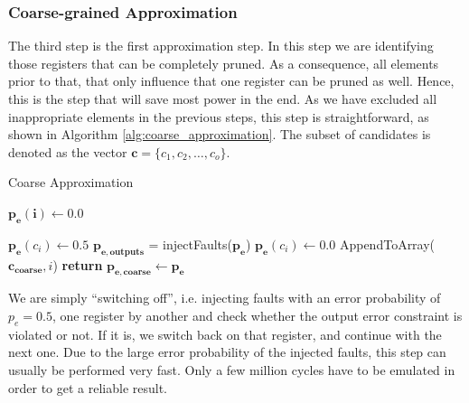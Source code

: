\documentclass[conference]{IEEEtran}
\begin{document}
\subsubsection{Coarse-grained Approximation}
The third step is the first approximation step. In this step we are identifying those registers that can be completely pruned. As a consequence, all elements prior to that, that only influence that one register can be pruned as well. Hence, this is the step that will save most power in the end. As we have excluded all inappropriate elements in the previous steps, this step is straightforward, as shown in Algorithm \ref{alg:coarse_approximation}. The subset of candidates is denoted as the vector $\mathbf{c} = \{c_1,c_2,\ldots,c_{o}\}$.
\begin{algorithm}
  \caption{Coarse Approximation}\label{alg:coarse_approximation}
  \begin{algorithmic}[1]
    \State $\mathbf{p_e(i)} \gets 0.0$
    \EndFor

    \State $\mathbf{p_e}(c_i) \gets 0.5$
    \State $\mathbf{p_{e,outputs}}$ = injectFaults($\mathbf{p_e}$)
    \State $\mathbf{p_e}(c_i) \gets 0.0$
    \Else
    \State AppendToArray($\mathbf{c_{coarse}},i$)
    \EndIf
    \EndFor
    \State \textbf{return} $\mathbf{p_{e,coarse}} \gets \mathbf{p_e}$
    \EndProcedure
  \end{algorithmic}
\end{algorithm}
We are simply ``switching off'', i.e. injecting faults with an error probability of $p_e=0.5$, one register by another and check whether the output error constraint is violated or not. If it is, we switch back on that register, and continue with the next one. Due to the large error probability of the injected faults, this step can usually be performed very fast. Only a few million cycles have to be emulated in order to get a reliable result.
\end{document}
